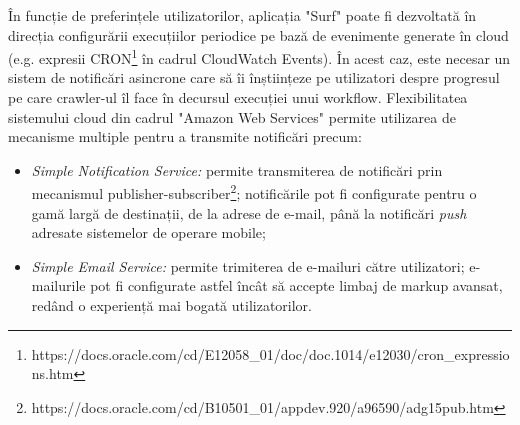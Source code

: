 În funcție de preferințele utilizatorilor, aplicația "Surf" poate fi dezvoltată în direcția configurării execuțiilor periodice pe bază de evenimente generate în cloud (e.g. expresii CRON\footnote{https://docs.oracle.com/cd/E12058\_01/doc/doc.1014/e12030/cron\_expressions.htm} în cadrul CloudWatch Events). În acest caz, este necesar un sistem de notificări asincrone care să îi înștiințeze pe utilizatori despre progresul pe care crawler-ul îl face în decursul execuției unui workflow. Flexibilitatea sistemului cloud din cadrul "Amazon Web Services" permite utilizarea de mecanisme multiple pentru a transmite notificări precum:

\begin{itemize}

	\item{\textit{Simple Notification Service:} permite transmiterea de notificări prin mecanismul publisher-subscriber\footnote{https://docs.oracle.com/cd/B10501\_01/appdev.920/a96590/adg15pub.htm}; notificările pot fi configurate pentru o gamă largă de destinații, de la adrese de e-mail, până la notificări \textit{push} adresate sistemelor de operare mobile;}
	
	\item{\textit{Simple Email Service:} permite trimiterea de e-mailuri către utilizatori; e-mailurile pot fi configurate astfel încât să accepte limbaj de markup avansat, redând o experiență mai bogată utilizatorilor.}
	
\end{itemize}

